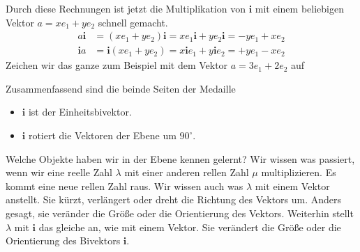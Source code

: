 \documentclass[fleqn]{scrartcl}
\numberwithin{equation}{section}
\def\*#1{\mathbf{#1}}
\begin{document}
Durch diese Rechnungen ist jetzt die Multiplikation von $\*i$ mit einem
beliebigen Vektor $a=xe_1+ye_2$ schnell gemacht.
\begin{align*}
    a\*i &= (xe_1+ye_2)\*i = xe_1\*i+ye_2\*i = -ye_1 + xe_2 \\
    \*ia &= \*i(xe_1+ye_2) = x\*ie_1+y\*ie_2 = +ye_1 - xe_2
\end{align*}
Zeichen wir das ganze zum Beispiel mit dem Vektor $a=3e_1+2e_2$ auf
\begin{center}
\begin{minipage}{\linewidth}
\centering
{}
\captionof{figure}{Rotation um $90^\circ$ mit $\*i$}
\label{fig:rotate90degree}
\end{minipage}
\end{center}

Zusammenfassend sind die beinde Seiten der Medaille
\begin{itemize}
    \item $\*i$ ist der Einheitsbivektor.
    \item $\*i$ rotiert die Vektoren der Ebene um $90^{\circ}$.
\end{itemize}

Welche Objekte haben wir in der Ebene kennen gelernt? Wir wissen was passiert,
wenn wir eine reelle Zahl $\lambda$ mit einer anderen rellen Zahl $\mu$
multiplizieren. Es kommt eine neue rellen Zahl raus. Wir wissen auch was
$\lambda$ mit einem Vektor anstellt. Sie kürzt, verlängert oder dreht die
Richtung des Vektors um. Anders gesagt, sie veränder die Größe oder die
Orientierung des Vektors. Weiterhin stellt $\lambda$ mit $\*i$ das gleiche an,
wie mit einem Vektor. Sie verändert die Größe oder die Orientierung des
Bivektors $\*i$.
\end{document}
